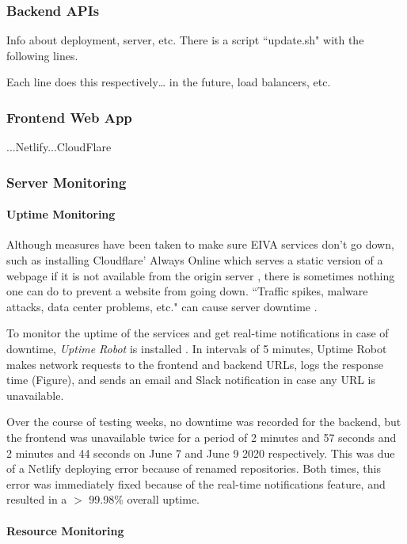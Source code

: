 \documentclass{article}
\begin{document}
\subsubsection{Backend APIs}

Info about deployment, server, etc. There is a script ``update.sh" with the following lines.

Each line does this respectively… in the future, load balancers, etc.

\subsubsection{Frontend Web App}

...Netlify...CloudFlare

\subsubsection{Server Monitoring}

\paragraph{Uptime Monitoring}

Although measures have been taken to make sure EIVA services don't go down, such as installing Cloudflare' Always Online which serves a static version of a webpage if it is not available from the origin server \cite{noauthor_keep_nodate}, there is sometimes nothing one can do to prevent a website from going down. ``Traffic spikes, malware attacks, data center problems, etc." can cause server downtime \cite{noauthor_what_2018}.

To monitor the uptime of the services and get real-time notifications in case of downtime, \emph{Uptime Robot} is installed \cite{noauthor_about_nodate}. In intervals of 5 minutes, Uptime Robot makes network requests to the frontend and backend URLs, logs the response time (Figure), and sends an email and Slack notification in case any URL is unavailable.

Over the course of testing weeks, no downtime was recorded for the backend, but the frontend was unavailable twice for a period of 2 minutes and 57 seconds and 2 minutes and 44 seconds on June 7 and June 9 2020 respectively. This was due of a Netlify deploying error because of renamed repositories. Both times, this error was immediately fixed because of the real-time notifications feature, and resulted in a $>$ 99.98\% overall uptime.

\paragraph{Resource Monitoring}
\end{document}
